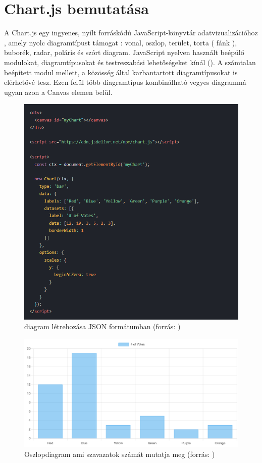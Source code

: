 \section{Chart.js bemutatása}

A Chart.js egy ingyenes, nyílt forráskódú JavaScript-könyvtár adatvizualizációhoz , amely nyolc diagramtípust támogat : vonal, oszlop, terület, torta ( fánk ), buborék, radar, poláris és szórt diagram. JavaScript nyelven használt beépülő modulokat, diagramtípusokat és testreszabási lehetőségeket kínál (). A számtalan beépített modul mellett, a közösség által karbantartott diagramtípusokat is elérhetővé tesz. Ezen felül több diagramtípus kombinálható vegyes diagrammá ugyan azon a Canvas elemen belül. \cite{ChartJS}

\begin{figure}[h]
\centering
\includegraphics[scale=0.6]{images/chartExample.png}
\caption{diagram létrehozása JSON formátumban (forrás: \cite{ChartJS})}
\label{fig:chartExample}
\end{figure}

\begin{figure}[h]
\centering
\includegraphics[scale=0.3]{images/barChartJSExample.png}
\caption{Oszlopdiagram ami szavazatok számát mutatja meg (forrás: \cite{ChartJS})}
\end{figure}

